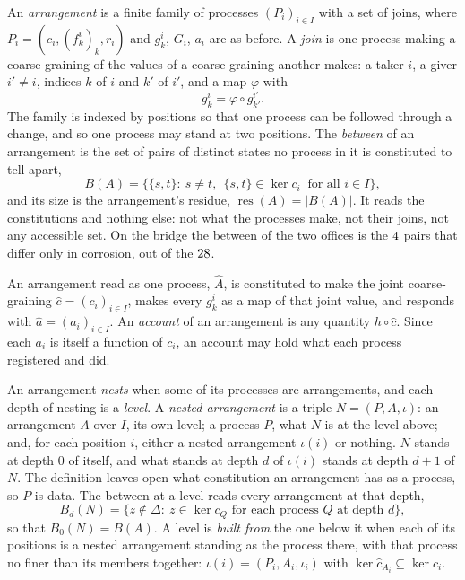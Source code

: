 \documentclass[11pt]{amsart}
\DeclareMathOperator{\res}{res}
\theoremstyle{plain}
\begin{document}
An \emph{arrangement} is a finite family of processes $(P_i)_{i\in I}$ with a set of joins, where $P_i=(c_i,(f^i_k)_k,r_i)$ and $g^i_k$, $G_i$, $a_i$ are as before. A \emph{join} is one process making a coarse-graining of the values of a coarse-graining another makes: a taker $i$, a giver $i'\ne i$, indices $k$ of $i$ and $k'$ of $i'$, and a map $\varphi$ with
\begin{equation}\label{eq:join}
  g^{i}_{k}=\varphi\circ g^{i'}_{k'}.
\end{equation}
The family is indexed by positions so that one process can be followed through a change, and so one process may stand at two positions. The \emph{between} of an arrangement is the set of pairs of distinct states no process in it is constituted to tell apart,
\begin{equation}\label{eq:between}
  B(A)=\bigl\{\{s,t\}:\ s\ne t,\ \ \{s,t\}\in\ker c_i\ \text{ for all }i\in I\bigr\},
\end{equation}
and its size is the arrangement's residue, $\res(A)=|B(A)|$. It reads the constitutions and nothing else: not what the processes make, not their joins, not any accessible set. On the bridge the between of the two offices is the $4$ pairs that differ only in corrosion, out of the $28$.

An arrangement read as one process, $\widehat A$, is constituted to make the joint coarse-graining $\hat c=(c_i)_{i\in I}$, makes every $g^i_k$ as a map of that joint value, and responds with $\hat a=(a_i)_{i\in I}$. An \emph{account} of an arrangement is any quantity $h\circ\hat c$. Since each $a_i$ is itself a function of $c_i$, an account may hold what each process registered and did.

An arrangement \emph{nests} when some of its processes are arrangements, and each depth of nesting is a \emph{level}. A \emph{nested arrangement} is a triple $N=(P,A,\iota)$: an arrangement $A$ over $I$, its own level; a process $P$, what $N$ is at the level above; and, for each position $i$, either a nested arrangement $\iota(i)$ or nothing. $N$ stands at depth $0$ of itself, and what stands at depth $d$ of $\iota(i)$ stands at depth $d+1$ of $N$. The definition leaves open what constitution an arrangement has as a process, so $P$ is data. The between at a level reads every arrangement at that depth,
\begin{equation}\label{eq:between-level}
  B_d(N)=\bigl\{z\notin\Delta:\ z\in\ker c_Q\text{ for each process }Q\text{ at depth }d\bigr\},
\end{equation}
so that $B_0(N)=B(A)$. A level is \emph{built from} the one below it when each of its positions is a nested arrangement standing as the process there, with that process no finer than its members together: $\iota(i)=(P_i,A_i,\iota_i)$ with $\ker\hat c_{A_i}\subseteq\ker c_i$.
\end{document}
